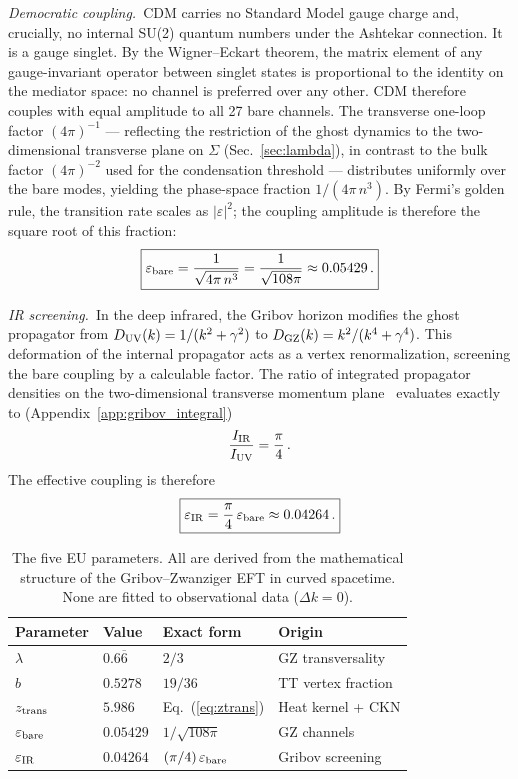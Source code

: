 \documentclass[a4paper,fleqn]{cas-dc}
\newcommand{\epsbare}{\varepsilon_{\rm bare}}
\newcommand{\epsIR}{\varepsilon_{\rm IR}}
\newcommand{\ztrans}{z_{\rm trans}}
\begin{document}
\textit{Democratic coupling.}~CDM carries no Standard
Model gauge charge and, crucially, no internal SU(2)
quantum numbers under the Ashtekar connection. It is a
gauge singlet. By the Wigner--Eckart theorem, the
matrix element of any gauge-invariant operator between
singlet states is proportional to the identity on the
mediator space: no channel is preferred over any other.
CDM therefore couples with equal amplitude to all 27
bare channels. The transverse one-loop factor
$(4\pi)^{-1}$ --- reflecting the restriction of the
ghost dynamics to the two-dimensional transverse plane
on $\Sigma$ (Sec.~\ref{sec:lambda}), in contrast to
the bulk factor $(4\pi)^{-2}$ used for the condensation
threshold --- distributes uniformly over the bare
modes, yielding the phase-space fraction
$1/(4\pi\,n^3)$. By Fermi's golden rule, the
transition rate scales as $|\varepsilon|^2$; the
coupling amplitude is therefore the square root of
this fraction:
\begin{equation}
\boxed{\epsbare = \frac{1}{\sqrt{4\pi\, n^3}}
  = \frac{1}{\sqrt{108\pi}} \approx 0.05429\,.}
\label{eq:epsbare}
\end{equation}

\textit{IR screening.}~In the deep infrared, the Gribov horizon
modifies the ghost propagator from
$D_{\rm UV}(k) = 1/(k^2 + \gamma^2)$ to
$D_{\rm GZ}(k) = k^2/(k^4 + \gamma^4)$. This deformation of
the internal propagator acts as a vertex renormalization,
screening the bare coupling by a calculable factor. The
ratio of integrated propagator densities on the
two-dimensional transverse momentum
plane~\cite{zwanziger1991} evaluates exactly to
(Appendix~\ref{app:gribov_integral})
\begin{equation}
\frac{I_{\rm IR}}{I_{\rm UV}} = \frac{\pi}{4}\,.
\label{eq:screening}
\end{equation}
The effective coupling is therefore
\begin{equation}
\boxed{\epsIR = \frac{\pi}{4}\,\epsbare \approx 0.04264\,.}
\label{eq:epsIR}
\end{equation}

\begin{table}[pos=!htbp]
\caption{The five EU parameters. All are derived from the
  mathematical structure of the Gribov--Zwanziger EFT in curved
  spacetime. None are fitted to observational data ($\Delta k = 0$).}
\label{tab:params}
\begin{tabular}{llll}
Parameter & Value & Exact form & Origin \\
\hline
$\lambda$ & $0.6\overline{6}$ & $2/3$ &
  GZ transversality \\
$b$ & $0.5278$ & $19/36$ &
  TT vertex fraction \\
$\ztrans$ & $5.986$ & Eq.~(\ref{eq:ztrans}) &
  Heat kernel + CKN \\
$\epsbare$ & $0.05429$ & $1/\sqrt{108\pi}$ &
  GZ channels \\
$\epsIR$ & $0.04264$ & $(\pi/4)\,\epsbare$ &
  Gribov screening \\
\end{tabular}
\end{table}
\end{document}

